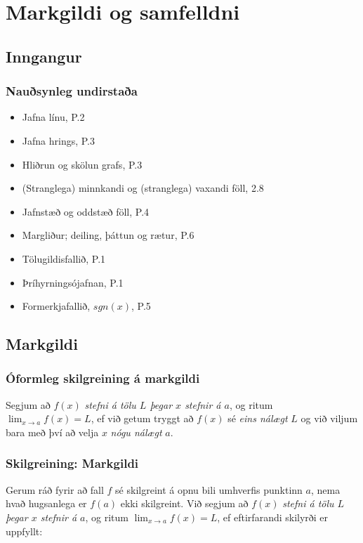 \documentclass[icelandic,a4paper,12pt]{article}
\date{29. ágúst 2015}
\begin{document}
\section{Markgildi og samfelldni}

\subsection{Inngangur}
\subsubsection{Nauðsynleg undirstaða}
\begin{itemize}
  \item Jafna línu, P.2
  \item Jafna hrings, P.3
  \item Hliðrun og skölun grafs, P.3
  \item (Stranglega) minnkandi og (stranglega) vaxandi föll, 2.8
  \item Jafnstæð og oddstæð föll, P.4
  \item Margliður; deiling, þáttun og rætur, P.6
  \item Tölugildisfallið, P.1
  \item Þríhyrningsójafnan, P.1
  \item Formerkjafallið, $sgn(x)$, P.5
\end{itemize}


\subsection{Markgildi}
\subsubsection{Óformleg skilgreining á markgildi}  
Segjum að  $f(x)$
{\it stefni á tölu $L$ þegar $x$ stefnir á $a$}, og ritum
$\lim_{x\rightarrow a} f(x)=L$, ef við getum tryggt að  $f(x)$ sé \emph{eins nálægt}
$L$ og við viljum bara með því að velja $x$ \emph{nógu nálægt} $a$.  

\pause

\subsubsection{Skilgreining: Markgildi} Gerum ráð fyrir að fall $f$ sé
skilgreint á opnu bili umhverfis punktinn $a$, nema hvað hugsanlega er
$f(a)$ ekki skilgreint. \pause 
Við segjum að $f(x)$
\emph{stefni á tölu $L$ þegar $x$ stefnir á $a$}, og ritum
$\lim_{x\rightarrow a} f(x)=L$, ef eftirfarandi skilyrði er uppfyllt:
\end{document}
